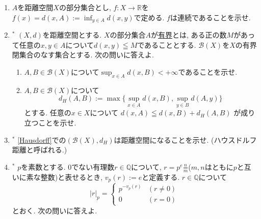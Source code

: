 \documentclass[dvipdfmx,a4paper,11pt]{article}
\newcommand{\R}{\mathbb{R}}
\newcommand{\Q}{\mathbb{Q}}
\theoremstyle{definition}
\begin{document}
\begin{enumerate}[label=\textbf{問}\ref*{sec-euc}.\arabic*]

  \item $A$を距離空間$X$の部分集合とし, $f : X \rightarrow \R$を$f(x) =d(x,A):= \inf_{y \in A} d(x,y)$で定める. $f$は連続であることを示せ.%
  
  

  
    \item $^{*}$\label{Hausdorff} $(X,d)$を距離空間とする.
    $X$の部分集合$A$が\underline{有界}とは, ある正の数$M$があって任意の$x, y \in A$について$d(x,y) \leqq M$であることとする. 
    $\mathcal{B}(X)$を$X$の有界閉集合のなす集合とする. 次の問いに答えよ.
        \begin{enumerate}
    \setlength{\parskip}{0cm} 
  \setlength{\itemsep}{0cm} 
    	\item $A,B \in \mathcal{B}(X)$について$\sup_{x \in A}d(x,B) < + \infty$であることを示せ.
	\item $A,B \in \mathcal{B}(X)$について
	$$
	d_{H}(A,B) := \max \{ \sup_{x \in A}d(x,B), \sup_{y  \in B}d(A,y)\}
	$$
	とする. 任意の$x \in X$について
	$
	d(x,A) \leqq d(x,B) + d_{H}(A,B) 
	$
	が成り立つことを示せ. 
    \end{enumerate}
\item $^{*}$ \ref{Hausdorff}での$(\mathcal{B}(X), d_{H})$は距離空間になることを示せ. (ハウスドルフ距離と呼ばれる.)

 
 \item \label{p-adic}$^{*}$ $p$を素数とする. 
0でない有理数$r \in \Q$について, $r=p^e\frac{n}{m}$($m,n$はともに$p$と互いに素な整数)と表せるとき, $v_{p}(r):=e$と定義する.
$r \in \Q$について
$$|r|_{p}= \begin{cases} p^{- v_{p}(r)}& (r\neq 0)\\0& (r=0)\end{cases}
$$
とおく. 次の問いに答えよ.


\end{enumerate}
\end{document}
